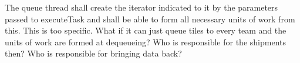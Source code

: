 \documentclass{article}
\begin{document}

The queue thread shall create the iterator indicated to it by the parameters
passed to executeTask and shall be able to form all necessary units of work from
this.  This is too specific.  What if it can just queue tiles to every team and
the units of work are formed at dequeueing?  Who is responsible for the
shipments then?  Who is responsible for bringing data back?



\end{document}
